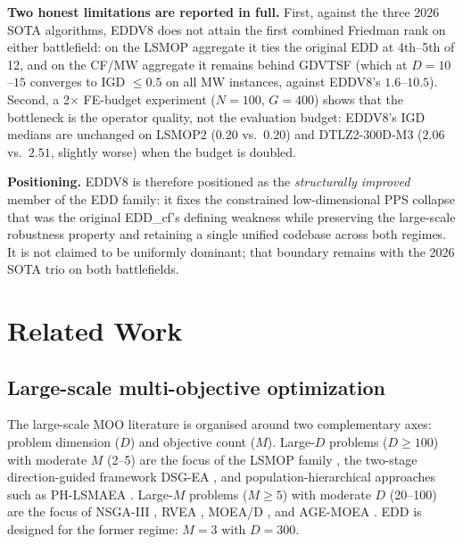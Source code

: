 \documentclass[preprint,12pt]{elsarticle}
\begin{document}
\textbf{Two honest limitations are reported in full.} First, against the
three 2026 SOTA algorithms, EDDV8 does not attain the first combined
Friedman rank on either battlefield: on the LSMOP aggregate it ties the
original EDD at 4th--5th of 12, and on the CF/MW aggregate it remains
behind GDVTSF (which at $D=10$--$15$ converges to IGD $\le 0.5$ on all
MW instances, against EDDV8's $1.6$--$10.5$). Second, a 2$\times$
FE-budget experiment ($N=100$, $G=400$) shows that the bottleneck is the
operator quality, not the evaluation budget: EDDV8's IGD medians are
unchanged on LSMOP2 ($0.20$ vs.\ $0.20$) and DTLZ2-300D-M3 ($2.06$ vs.\
$2.51$, slightly worse) when the budget is doubled.

\textbf{Positioning.} EDDV8 is therefore positioned as the
\emph{structurally improved} member of the EDD family: it fixes the
constrained low-dimensional PPS collapse that was the original EDD\_cf's
defining weakness while preserving the large-scale robustness property and
retaining a single unified codebase across both regimes. It is not claimed
to be uniformly dominant; that boundary remains with the 2026 SOTA trio
on both battlefields.

\section{Related Work}
\label{sec:related}

\subsection{Large-scale multi-objective optimization}

The large-scale MOO literature is organised around two complementary axes:
problem dimension ($D$) and objective count ($M$). Large-$D$ problems
($D \ge 100$) with moderate $M$ (2--5) are the focus of the LSMOP family
\cite{cheng2017test}, the two-stage direction-guided framework DSG-EA
\cite{zou2024two}, and population-hierarchical approaches such as PH-LSMAEA
\cite{wang2024population}. Large-$M$ problems ($M \ge 5$) with moderate $D$
(20--100) are the focus of NSGA-III \cite{deb2014an}, RVEA
\cite{cheng2016a}, MOEA/D \cite{qingfuzhang2007moead}, and AGE-MOEA
\cite{panichella2019an}. EDD is designed for the former regime: $M = 3$ with
$D = 300$.
\end{document}
